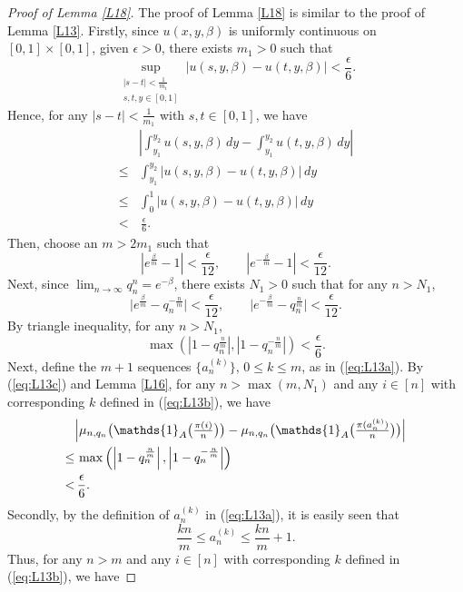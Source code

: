 \begin{proof}[Proof of Lemma \ref{L18}]
The proof of Lemma \ref{L18} is similar to the proof of Lemma \ref{L13}. 
Firstly, since $u(x, y, \beta)$ is uniformly continuous on $[0, 1] \times [0, 1]$, given $\epsilon > 0$, there exists $m_1 > 0$ such that
\[
\sup_{ \substack{|s - t|< \frac{1}{m_1}\\
                 s, t, y\in [0, 1]}}
                 |u(s, y, \beta) - u(t, y, \beta)| < \frac{\epsilon}{6}.
\]
Hence, for any $|s - t|< \frac{1}{m_1}$ with $s, t\in [0, 1]$, we have
\begin{align}
    &\left|\int_{y_1}^{y_2} u(s, y, \beta)\, dy - \int_{y_1}^{y_2} u(t, y, \beta)\, dy \right|  \label{eq:L18a}\\
 \le&\int_{y_1}^{y_2}|u(s, y, \beta) - u(t, y, \beta)|\, dy  \nonumber\\
 \le&\int_{0}^{1}|u(s, y, \beta) - u(t, y, \beta)|\, dy  \nonumber\\
  <&\, \frac{\epsilon}{6}. \nonumber
\end{align}
Then, choose an $m > 2 m_1$ such that
\[
\left|e^{\frac{\beta}{m}} - 1 \right| < \frac{\epsilon}{12}, \qquad
\left|e^{-\frac{\beta}{m}} - 1 \right| < \frac{\epsilon}{12}.
\]
Next, since $\lim_{n \to \infty} q_n^n = e^{-\beta}$, there exists $N_1> 0$ such that for any $n > N_1$,
\[
\Big|e^{\frac{\beta}{m}} - q_{n}^{- \frac{n}{m}} \Big| < \frac{\epsilon}{12}, \qquad
\Big|e^{-\frac{\beta}{m}} - q_{n}^{\frac{n}{m}} \Big| < \frac{\epsilon}{12}.
\]
By triangle inequality, for any $n > N_1$,
\[
\max{\left(\left|1-q_n^{\frac{n}{m}}\right|, \left|1-q_n^{-\frac{n}{m}}\right|\right)} < \frac{\epsilon}{6}.
\]
Next, define the $m+1$ sequences $\{ a^{(k)}_n \}$, $0 \le k \le m$, as in (\ref{eq:L13a}). By (\ref{eq:L13c}) and Lemma \ref{L16}, for any $n > \max{(m, N_1)}$ and any $i \in [n]$ with
corresponding $k$ defined in (\ref{eq:L13b}), we have
\begin{align}
   &\textstyle\Big| \n \big(\mathds{1}_A\big(\frac{\pi(i)}{n}\big)\big) - \n \big(\mathds{1}_A\big(\frac{\pi(a_n^{(k)})}{n}\big)\big)\Big| \label{eq:L18b}\\
 \le&\, \textstyle\max{\left(\left|1-q_n^{\frac{n}{m}}\right|, \left|1-q_n^{-\frac{n}{m}}\right|\right)}  \nonumber\\
 <&\, \frac{\epsilon}{6}. \nonumber
\end{align}
Secondly, by the definition of $a^{(k)}_n$ in (\ref{eq:L13a}), it is easily seen that
\[
\frac{k n}{m} \le a^{(k)}_n \le \frac{k n}{m} +1.
\]
Thus, for any $n > m$ and any $i \in [n]$ with corresponding $k$ defined in (\ref{eq:L13b}), we have

\end{proof}
